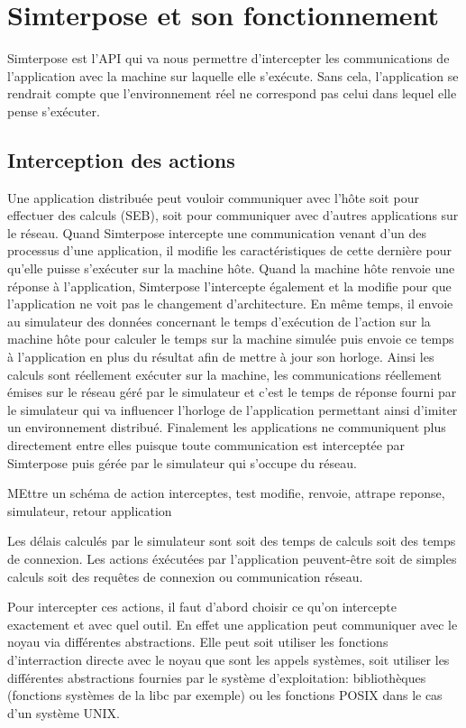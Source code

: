 \section{Simterpose et son fonctionnement}
Simterpose est l'API qui va nous permettre d'intercepter les communications de
l'application avec la machine sur laquelle elle s'exécute. Sans cela,
l'application se rendrait compte que l'environnement réel ne correspond pas
celui dans lequel elle pense s'exécuter.

\subsection{Interception des actions}
 Une application distribuée peut vouloir communiquer avec l'hôte soit pour
 effectuer des calculs (SEB), soit pour communiquer avec d'autres applications
 sur le réseau. Quand Simterpose intercepte une communication venant d'un des
 processus d'une application, il modifie les caractéristiques de cette dernière
 pour qu'elle puisse s'exécuter sur la machine hôte. Quand la machine hôte
 renvoie une réponse à l'application, Simterpose l'intercepte également et la
 modifie pour que l'application ne voit pas le changement d'architecture. En
 même temps, il envoie au simulateur des données concernant le temps d'exécution
 de l'action sur la machine hôte pour calculer le temps sur la machine simulée
 puis envoie ce temps à l'application en plus du résultat afin de mettre à jour
 son horloge. Ainsi les calculs sont réellement exécuter sur la machine, les
 communications réellement émises sur le réseau géré par le simulateur et c'est
 le temps de réponse fourni par le simulateur qui va influencer l'horloge de
 l'application permettant ainsi d'imiter un environnement distribué. Finalement
 les applications ne communiquent plus directement entre elles puisque toute
 communication est interceptée par Simterpose puis gérée par le simulateur qui
 s'occupe du réseau.

{\color{red} MEttre un schéma de action interceptes, test modifie, renvoie,
  attrape reponse, simulateur, retour application}

Les délais calculés par le simulateur sont soit des temps de calculs soit des
temps de connexion. Les actions éxécutées par l'application peuvent-être soit
de simples calculs soit des requêtes de connexion ou communication réseau.

Pour intercepter ces actions, il faut d'abord choisir ce qu'on intercepte
exactement et avec quel outil. En effet une application peut communiquer avec le
noyau via différentes abstractions. Elle peut soit utiliser les fonctions
d'interraction directe avec le noyau que sont les appels systèmes, soit utiliser
les différentes abstractions fournies par le système d'exploitation:
bibliothèques (fonctions systèmes de la libc par exemple) ou les fonctions POSIX
dans le cas d'un système UNIX.

